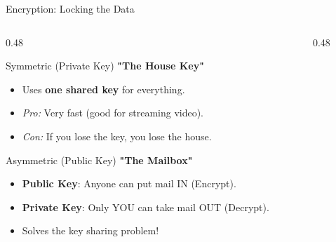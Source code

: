 \documentclass[aspectratio=169]{beamer}  %
\begin{document}
\begin{frame}{Encryption: Locking the Data}
    \begin{columns}[T]
        \begin{column}{0.48\textwidth}
            \begin{block}{Symmetric (Private Key)}
                \footnotesize
                \textbf{"The House Key"}
                \begin{itemize}\setlength{\itemsep}{1pt}
                    \item Uses \textbf{one shared key} for everything.
                    \item \textit{Pro:} Very fast (good for streaming video).
                    \item \textit{Con:} If you lose the key, you lose the house.
                \end{itemize}
            \end{block}
            \begin{block}{Asymmetric (Public Key)}
                \footnotesize
                \textbf{"The Mailbox"}
                \begin{itemize}\setlength{\itemsep}{1pt}
                    \item \textbf{Public Key}: Anyone can put mail IN (Encrypt).
                    \item \textbf{Private Key}: Only YOU can take mail OUT (Decrypt).
                    \item Solves the key sharing problem!
                \end{itemize}
            \end{block}
        \end{column}
        \begin{column}{0.48\textwidth}
            \begin{center}
            \end{center}
        \end{column}
    \end{columns}
\end{frame}
\end{document}
